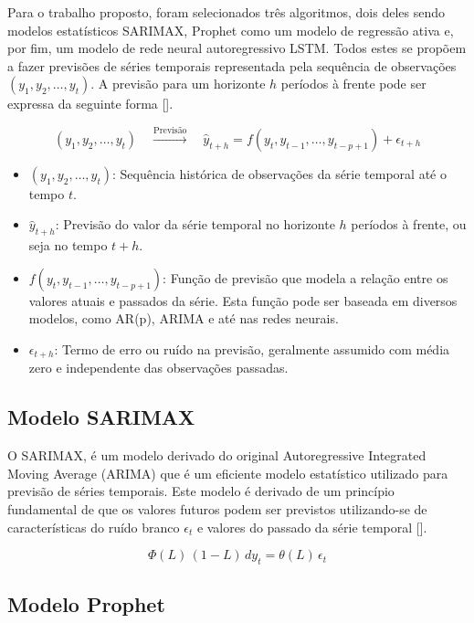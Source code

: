 \documentclass[12pt]{article}
\begin{document}
Para o trabalho proposto, foram selecionados três algoritmos, dois deles sendo modelos estatísticos SARIMAX, Prophet como um modelo de regressão ativa e, por fim, um modelo de rede neural autoregressivo LSTM. Todos estes se propõem a fazer previsões de séries temporais representada pela sequência de observações \( (y_1, y_2, \dots, y_t) \). A previsão para um horizonte \( h \) períodos à frente pode ser expressa da seguinte forma [\cite{adhikari_introductory_2013}].

\[
\left( y_1, y_2, \dots, y_t \right) \quad \xrightarrow{\text{Previsão}} \quad \hat{y}_{t+h} = f\left( y_t, y_{t-1}, \dots, y_{t-p+1} \right) + \epsilon_{t+h}
\]

\begin{itemize}
    \item \( \left( y_1, y_2, \dots, y_t \right) \): Sequência histórica de observações da série temporal até o tempo \( t \).
    \item \( \hat{y}_{t+h} \): Previsão do valor da série temporal no horizonte \( h \) períodos à frente, ou seja no tempo \( t+h \).
    \item \( f\left( y_t, y_{t-1}, \dots, y_{t-p+1} \right) \): Função de previsão que modela a relação entre os valores atuais e passados da série. Esta função pode ser baseada em diversos modelos, como AR(p), ARIMA e até nas redes neurais.
    \item \( \epsilon_{t+h} \): Termo de erro ou ruído na previsão, geralmente assumido com média zero e independente das observações passadas.
\end{itemize}

\subsection{Modelo SARIMAX}

O SARIMAX, é um modelo derivado do original Autoregressive Integrated Moving Average (ARIMA) que é um eficiente modelo estatístico utilizado para previsão de séries temporais. Este modelo é derivado de um princípio fundamental de que os valores futuros podem ser previstos utilizando-se de características do ruído branco \( \epsilon_t \) e valores do passado da série temporal [\cite{madan_predicting_2018}].

\[
\Phi(L) \, (1 - L) \, d y_t = \theta(L) \, \epsilon_t
\]

\subsection{Modelo Prophet}
\end{document}
